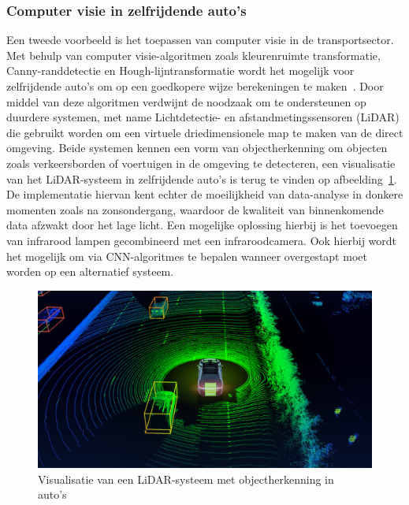 \subsubsection{Computer visie in zelfrijdende auto's}
Een tweede voorbeeld is het toepassen van computer visie in de transportsector.
Met behulp van computer visie-algoritmen zoals kleurenruimte transformatie, Canny-randdetectie en Hough-lijntransformatie wordt het mogelijk voor zelfrijdende auto's om op een goedkopere wijze berekeningen te maken~\autocite{Gajjar2023}.
Door middel van deze algoritmen verdwijnt de noodzaak om te ondersteunen op duurdere systemen, met name Lichtdetectie- en afstandmetingssensoren (LiDAR) die gebruikt worden om een virtuele driedimensionele map te maken van de direct omgeving.
Beide systemen kennen een vorm van objectherkenning om objecten zoals verkeersborden of voertuigen in de omgeving te detecteren, een visualisatie van het LiDAR-systeem in zelfrijdende auto's is terug te vinden op afbeelding~\ref{fig:visualisatie-lidar}.
De implementatie hiervan kent echter de moeilijkheid van data-analyse in donkere momenten zoals na zonsondergang, waardoor de kwaliteit van binnenkomende data afzwakt door het lage licht.
Een mogelijke oplossing hierbij is het toevoegen van infrarood lampen gecombineerd met een infraroodcamera.
Ook hierbij wordt het mogelijk om via CNN-algoritmes te bepalen wanneer overgestapt moet worden op een alternatief systeem.
\begin{figure}
    \includegraphics[width=1\linewidth]{images/visualisatie-lidar}
    \caption{Visualisatie van een LiDAR-systeem met objectherkenning in auto's~\autocite{Badoni2021}}
    \label{fig:visualisatie-lidar}
\end{figure}

